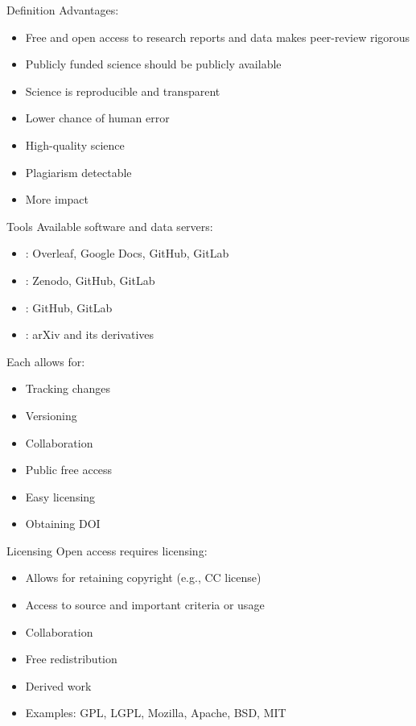 \documentclass[10pt]{beamer}
\begin{document}
\begin{frame}{Definition}
\textcolor{subtitle}{Advantages:}
\begin{itemize}
  \item Free and open access to research reports and data makes peer-review rigorous
  \item Publicly funded science should be publicly available
  \item Science is reproducible and transparent
  \item Lower chance of human error
  \item High-quality science
  \item Plagiarism detectable
  \item More impact
\end{itemize}
\end{frame}

\begin{frame}{Tools}
\textcolor{subtitle}{Available software and data servers:}
\begin{itemize}
  \item {\color{red}{Publications}}: Overleaf, Google Docs, GitHub, GitLab
  \item {\color{red}{Data}}: Zenodo, GitHub, GitLab
  \item {\color{red}{Software}}: GitHub, GitLab
  \item {\color{red}{Preprint servers}}: arXiv and its derivatives
\end{itemize}
\vspace{0.5cm}
\textcolor{subtitle}{Each allows for:}
\begin{itemize}
  \item Tracking changes
  \item Versioning
  \item Collaboration
  \item Public free access
  \item Easy licensing
  \item Obtaining DOI
\end{itemize}
\end{frame}

\begin{frame}{Licensing}
\textcolor{subtitle}{Open access requires licensing:}
\begin{itemize}
  \item Allows for retaining copyright (e.g., CC license)
  \item Access to source and important criteria or usage
  \item Collaboration
  \item Free redistribution
  \item Derived work
  \item Examples: GPL, LGPL, Mozilla, Apache, BSD, MIT
\end{itemize}
\end{frame}
\end{document}
